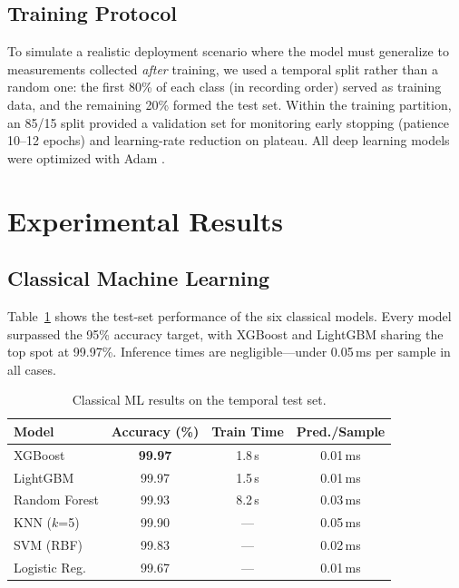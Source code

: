 \documentclass[conference,a4paper]{IEEEtran}
\begin{document}
\subsection{Training Protocol}

To simulate a realistic deployment scenario where the model must generalize to measurements collected \emph{after} training, we used a temporal split rather than a random one: the first 80\% of each class (in recording order) served as training data, and the remaining 20\% formed the test set. Within the training partition, an 85/15 split provided a validation set for monitoring early stopping (patience 10--12 epochs) and learning-rate reduction on plateau. All deep learning models were optimized with Adam \cite{lecun2015}.

\section{Experimental Results}

\subsection{Classical Machine Learning}

Table~\ref{tab:classical_results} shows the test-set performance of the six classical models. Every model surpassed the 95\% accuracy target, with XGBoost and LightGBM sharing the top spot at 99.97\%. Inference times are negligible---under 0.05\,ms per sample in all cases.

\begin{table}[H]
\centering
\caption{Classical ML results on the temporal test set.}
\label{tab:classical_results}
\begin{tabular}{lccc}
\toprule
\textbf{Model} & \textbf{Accuracy (\%)} & \textbf{Train Time} & \textbf{Pred./Sample} \\
\midrule
XGBoost        & \textbf{99.97} & 1.8\,s & 0.01\,ms \\
LightGBM       & 99.97          & 1.5\,s & 0.01\,ms \\
Random Forest  & 99.93          & 8.2\,s & 0.03\,ms \\
KNN ($k$=5)    & 99.90          & ---    & 0.05\,ms \\
SVM (RBF)      & 99.83          & ---    & 0.02\,ms \\
Logistic Reg.  & 99.67          & ---    & 0.01\,ms \\
\bottomrule
\end{tabular}
\end{table}
\end{document}
